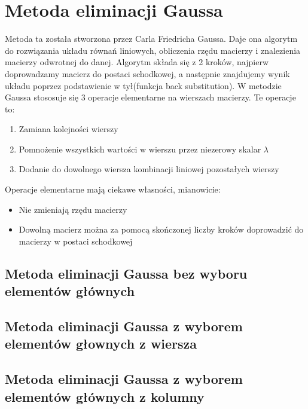\documentclass[a4paper,10pt]{article}
\begin{document}
\section{Metoda eliminacji Gaussa}
	Metoda ta została stworzona przez Carla Friedricha Gaussa. Daje ona algorytm do rozwiązania układu równań liniowych,
	obliczenia rzędu macierzy i znalezienia macierzy odwrotnej do danej. Algorytm składa się z 2 kroków, najpierw doprowadzamy
	macierz do postaci schodkowej, a następnie znajdujemy wynik układu poprzez podstawienie w tył(funkcja back substitution).
	W metodzie Gaussa stososuje się 3 operacje elementarne na wierszach macierzy. Te operacje to:
	\begin{enumerate}
		\item Zamiana kolejności wierszy
		\item Pomnożenie wszystkich wartości w wierszu przez niezerowy skalar $\lambda$
		\item Dodanie do dowolnego wiersza kombinacji liniowej pozostałych wierszy
	\end{enumerate}
	Operacje elementarne mają ciekawe własności, mianowicie:
	\begin{itemize}
		\item Nie zmieniają rzędu macierzy
		\item Dowolną macierz można za pomocą skończonej liczby kroków doprowadzić do macierzy w postaci schodkowej
	\end{itemize}
	\subsection{Metoda eliminacji Gaussa bez wyboru elementów głównych}%
    \subsection{Metoda eliminacji Gaussa z wyborem elementów głownych z wiersza}%
    \subsection{Metoda eliminacji Gaussa z wyborem elementów głównych z kolumny}%
\end{document}
